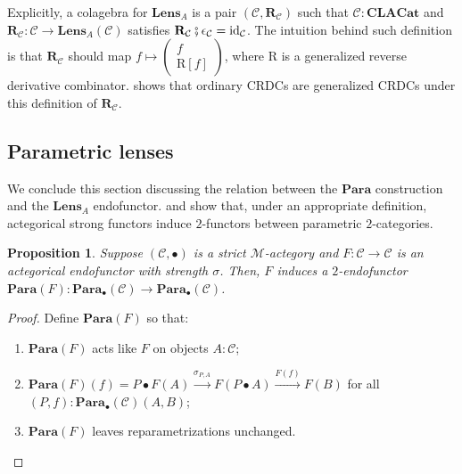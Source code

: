 \documentclass[11pt,a4paper,openright,twoside]{report}
\newcounter{mycounter}
\theoremstyle{plain}
\newtheorem{proposition}[mycounter]{Proposition}
\theoremstyle{definition}
\begin{document}
Explicitly, a colagebra for $\mathbf{Lens}_A$ is a pair $(\mathcal{C}, \mathbf{R}_{\mathcal{C}})$ such that $\mathcal{C}: \mathbf{CLACat}$ and $\mathbf{R}_{\mathcal{C}}: \mathcal{C} \to \mathbf{Lens}_A(\mathcal{C})$ satisfies $\mathbf{R}_{\mathcal{C}} \fatsemi \epsilon_{\mathcal{C}} = \mathrm{id}_{\mathcal{C}}$. The intuition behind such definition is that $\mathbf{R}_{\mathcal{C}}$ should map $f \mapsto \left(\begin{smallmatrix} f \\ \mathrm{R}[f] \end{smallmatrix}\right)$, where $\mathrm{R}$ is a generalized reverse derivative combinator. \cite{gavranovic2024fundamental} shows that ordinary CRDCs are generalized CRDCs under this definition of $\mathbf{R}_{\mathcal{C}}$. 

\subsection{Parametric lenses}

We conclude this section discussing the relation between the $\mathbf{Para}$ construction and the $\mathbf{Lens}_A$ endofunctor. \cite{gavranovic2024fundamental} and \cite{gavranovicposition} show that, under an appropriate definition, actegorical strong functors induce $2$-functors between parametric $2$-categories.

\begin{proposition}
  \label{prop: paraend}
  Suppose $(\mathcal{C}, \bullet)$ is a strict $\mathcal{M}$-actegory and $F: \mathcal{C} \to \mathcal{C}$ is an actegorical endofunctor with strength $\sigma$. Then, $F$ induces a  $2$-endofunctor $\mathbf{Para}(F): \mathbf{Para}_{\bullet}(\mathcal{C}) \to \mathbf{Para}_{\bullet}(\mathcal{C})$.
\end{proposition}
\begin{proof}
  Define $\mathbf{Para}(F)$ so that: 
  \begin{enumerate}
    \item $\mathbf{Para}(F)$ acts like $F$ on objects $A: \mathcal{C}$;
    \item $\mathbf{Para}(F)(f) = P \bullet F(A) \stackrel{\sigma_{P,A}}{\longrightarrow} F(P \bullet A) \stackrel{F(f)}{\longrightarrow} F(B)$ for all $(P,f):\mathbf{Para}_{\bullet}(\mathcal{C})(A,B)$;
    \item $\mathbf{Para}(F)$ leaves reparametrizations unchanged.
  \end{enumerate}
\end{proof}
\end{document}
